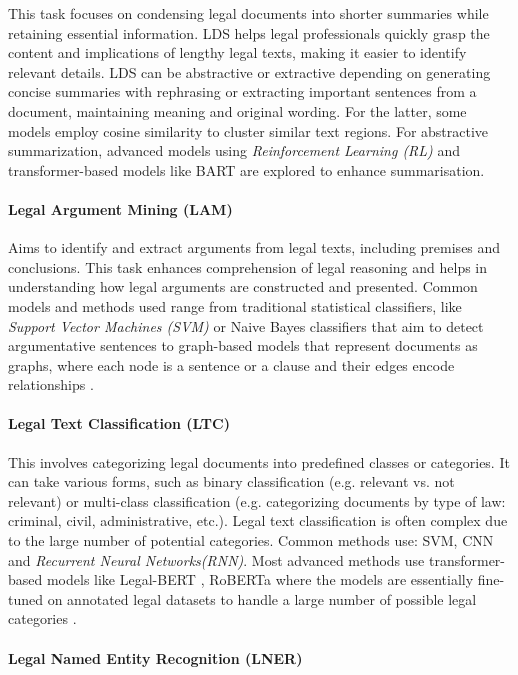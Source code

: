 \documentclass[onecolumn, journal, english, 12pt, a4paper]{IEEEtran} %
\theoremstyle{definition}
\begin{document}
This task focuses on condensing legal documents into shorter summaries
while retaining essential information. LDS helps legal professionals
quickly grasp the content and implications of lengthy legal texts,
making it easier to identify relevant details. LDS can be abstractive
or extractive depending on generating concise summaries with
rephrasing or extracting important sentences from a document,
maintaining meaning and original wording. For the latter, some models
employ cosine similarity to cluster similar text regions. For
abstractive summarization, advanced models using \textit{Reinforcement
Learning (RL)} and transformer-based models like BART are explored to
enhance summarisation\cite{Ariai2024}.

\paragraph{Legal Argument Mining (LAM)}

Aims to identify and extract arguments from legal texts, including
premises and conclusions. This task enhances comprehension of legal
reasoning and helps in understanding how legal arguments are
constructed and presented. Common models and methods used range from
traditional statistical classifiers, like \textit{Support Vector
  Machines (SVM)} or Naive Bayes classifiers that aim to detect
argumentative sentences to graph-based models that represent documents
as graphs, where each node is a sentence or a clause and their edges
encode relationships \cite{Ariai2024}.

\paragraph{Legal Text Classification (LTC)}

This involves categorizing legal documents into predefined classes or
categories. It can take various forms, such as binary classification
(e.g. relevant vs. not relevant) or multi-class classification (e.g.
categorizing documents by type of law: criminal, civil,
administrative, etc.). Legal text classification is often complex due
to the large number of potential categories. Common methods use: SVM,
CNN and \textit{Recurrent Neural Networks(RNN)}. Most advanced methods
use transformer-based models like Legal-BERT
\cite{chalkidis2020legal}, RoBERTa where the models are essentially
fine-tuned on annotated legal datasets to handle a large number of
possible legal categories \cite{Ariai2024}.

\paragraph{Legal Named Entity Recognition (LNER)}
\end{document}
